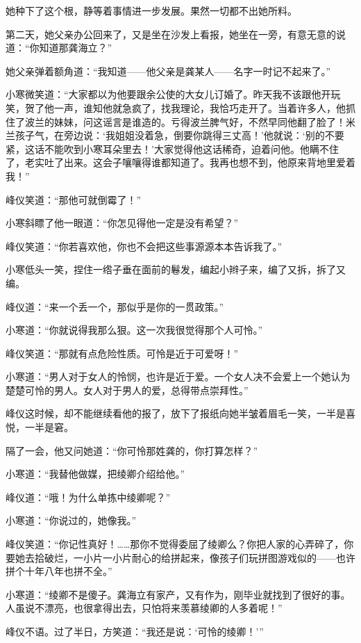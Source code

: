 \par 她种下了这个根，静等着事情进一步发展。果然一切都不出她所料。
\par 第二天，她父亲办公回来了，又是坐在沙发上看报，她坐在一旁，有意无意的说道：“你知道那龚海立？”
\par 她父亲弹着额角道：“我知道——他父亲是龚某人——名字一时记不起来了。”
\par 小寒微笑道：“大家都以为他要跟余公使的大女儿订婚了。昨天我不该跟他开玩笑，贺了他一声，谁知他就急疯了，找我理论，我恰巧走开了。当着许多人，他抓住了波兰的妹妹，问这谣言是谁造的。亏得波兰脾气好，不然早同他翻了脸了！米兰孩子气，在旁边说：‘我姐姐没着急，倒要你跳得三丈高！’他就说：‘别的不要紧，这话不能吹到小寒耳朵里去！’大家觉得他这话稀奇，迫着问他。他瞒不住了，老实吐了出来。这会子嚷嚷得谁都知道了。我再也想不到，他原来背地里爱着我！”
\par 峰仪笑道：“那他可就倒霉了！”
\par 小寒斜瞟了他一眼道：“你怎见得他一定是没有希望？”
\par 峰仪笑道：“你若喜欢他，你也不会把这些事源源本本告诉我了。”
\par 小寒低头一笑，捏住一绺子垂在面前的鬈发，编起小辫子来，编了又拆，拆了又编。
\par 峰仪道：“来一个丢一个，那似乎是你的一贯政策。”
\par 小寒道：“你就说得我那么狠。这一次我很觉得那个人可怜。”
\par 峰仪笑道：“那就有点危险性质。可怜是近于可爱呀！”
\par 小寒道：“男人对于女人的怜悯，也许是近于爱。一个女人决不会爱上一个她认为楚楚可怜的男人。女人对于男人的爱，总得带点崇拜性。”
\par 峰仪这时候，却不能继续看他的报了，放下了报纸向她半皱着眉毛一笑，一半是喜悦，一半是窘。
\par 隔了一会，他又问她道：“你可怜那姓龚的，你打算怎样？”
\par 小寒道：“我替他做媒，把绫卿介绍给他。”
\par 峰仪道：“哦！为什么单拣中绫卿呢？”
\par 小寒道：“你说过的，她像我。”
\par 峰仪笑道：“你记性真好！……那你不觉得委屈了绫卿么？你把人家的心弄碎了，你要她去拾破烂，一小片一小片耐心的给拼起来，像孩子们玩拼图游戏似的——也许拼个十年八年也拼不全。”
\par 小寒道：“绫卿不是傻子。龚海立有家产，又有作为，刚毕业就找到了很好的事。人虽说不漂亮，也很拿得出去，只怕将来羡慕绫卿的人多着呢！”
\par 峰仪不语。过了半日，方笑道：“我还是说：‘可怜的绫卿！'”
